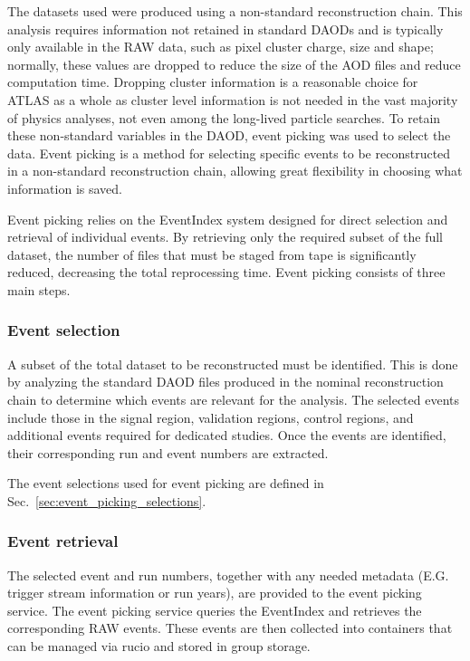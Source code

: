 The datasets used were produced using a non-standard reconstruction chain.
This analysis requires information not retained in standard DAODs and is typically only available in the RAW data, such as pixel cluster charge, size and shape; 
normally, these values are dropped to reduce the size of the AOD files and reduce computation time. 
Dropping cluster information is a reasonable choice for ATLAS as a whole as cluster level information is not needed in the vast majority of physics analyses, not even among the long-lived particle searches. 
To retain these non-standard variables in the DAOD, event picking was used to select the data. 
Event picking is a method for selecting specific events to be reconstructed in a non-standard reconstruction chain, allowing great flexibility in choosing what information is saved.

Event picking relies on the EventIndex system designed for direct selection and retrieval of individual events. 
By retrieving only the required subset of the full dataset, the number of files that must be staged from tape is significantly reduced, decreasing the total reprocessing time. 
Event picking consists of three main steps.

\subsubsection{Event selection}
A subset of the total dataset to be reconstructed must be identified.
This is done by analyzing the standard DAOD files produced in the nominal reconstruction chain to determine which events are relevant for the analysis. 
The selected events include those in the signal region, validation regions, control regions, and additional events required for dedicated studies.
Once the events are identified, their corresponding run and event numbers are extracted. 

The event selections used for event picking are defined in Sec.~\ref{sec:event_picking_selections}.

\subsubsection{Event retrieval}
The selected event and run numbers, together with any needed metadata (E.G. trigger stream information or run years), are provided to the event picking service.
The event picking service queries the EventIndex and retrieves the corresponding RAW events. 
These events are then collected into containers that can be managed via rucio and stored in group storage.  


